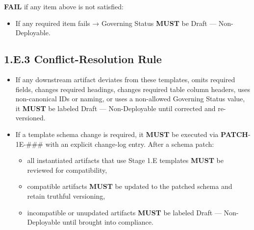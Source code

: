 \documentclass[10pt]{article}
\begin{document}
\textbf{FAIL} if any item above is not satisfied:

\begin{itemize}
\item If any required item fails → Governing Status \textbf{MUST} be Draft — Non-Deployable.
\end{itemize}

\subsection*{1.E.3 Conflict-Resolution Rule}
{}

\begin{itemize}
\item If any downstream artifact deviates from these templates, omits required fields, changes required headings, changes required table column headers, uses non-canonical IDs or naming, or uses a non-allowed Governing Status value, it \textbf{MUST} be labeled Draft — Non-Deployable until corrected and re-versioned.

\item If a template schema change is required, it \textbf{MUST} be executed via \textbf{PATCH}-1E-\#\#\# with an explicit change-log entry. After a schema patch:
  \begin{itemize}
  \item all instantiated artifacts that use Stage 1.E templates \textbf{MUST} be reviewed for compatibility,
  \item compatible artifacts \textbf{MUST} be updated to the patched schema and retain truthful versioning,
  \item incompatible or unupdated artifacts \textbf{MUST} be labeled Draft — Non-Deployable until brought into compliance.
  \end{itemize}
\end{itemize}
\end{document}
